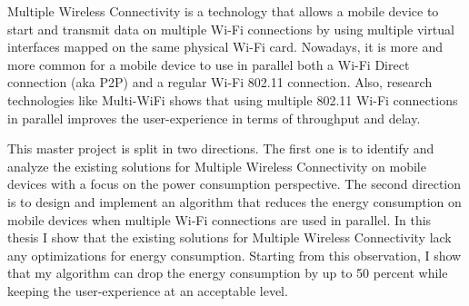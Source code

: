 
Multiple Wireless Connectivity is a technology that allows a mobile device to
start and transmit data on multiple Wi-Fi connections by using multiple virtual
interfaces mapped on the same physical Wi-Fi card. Nowadays, it is more and
more common for a mobile device to use in parallel both a Wi-Fi Direct
connection (aka P2P) and a regular Wi-Fi 802.11 connection. Also, research
technologies like Multi-WiFi shows that using multiple 802.11 Wi-Fi connections
in parallel improves the user-experience in terms of throughput and delay.

This master project is split in two directions. The first one is to identify
and analyze the existing solutions for Multiple Wireless Connectivity on mobile
devices with a focus on the power consumption perspective. The second direction
is to design and implement an algorithm that reduces the energy consumption
on mobile devices when multiple Wi-Fi connections are used in parallel. In this
thesis I show that the existing solutions for Multiple Wireless Connectivity
lack any optimizations for energy consumption. Starting from this observation,
I show that my algorithm can drop the energy consumption by up to 50 percent
while keeping the user-experience at an acceptable level.





 

